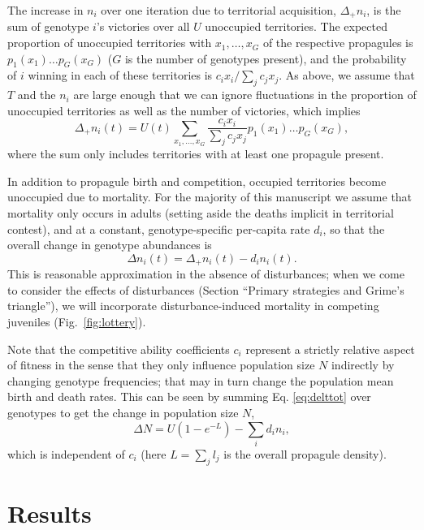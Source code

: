 \documentclass[11pt]{article}
\begin{document}
The increase in $n_i$ over one iteration due to territorial acquisition, $\Delta_+ n_i$, is the sum of genotype $i$'s victories over all $U$ unoccupied territories. The expected proportion of unoccupied territories with $x_1,\ldots,x_G$ of the respective propagules is $p_1(x_1)\ldots p_G(x_G)$ ($G$ is the number of genotypes present), and the probability of $i$ winning in each of these territories is $c_i x_i/\sum_j c_j x_j$. As above, we assume that $T$ and the $n_i$ are large enough that we can ignore fluctuations in the proportion of unoccupied territories as well as the number of victories, which implies
\begin{equation}
\Delta_+ n_i(t)=U(t)\sum_{x_1,\ldots,x_G} \frac{c_i x_i}{\sum_j c_j x_j} p_1(x_1)\ldots p_G(x_G), \label{eq:growthsumuncoupled}
\end{equation}
where the sum only includes territories with at least one propagule present. 

In addition to propagule birth and competition, occupied territories become unoccupied due to mortality. For the majority of this manuscript we assume that mortality only occurs in adults (setting aside the deaths implicit in territorial contest), and at a constant, genotype-specific per-capita rate $d_i$, so that the overall change in genotype abundances is
\begin{equation}
\Delta n_i(t)=\Delta_+ n_i(t)-d_i n_i(t). \label{eq:delttot}
\end{equation}
This is reasonable approximation in the absence of disturbances; when we come to consider the effects of disturbances (Section ``Primary strategies and Grime's triangle''), we will incorporate disturbance-induced mortality in competing juveniles (Fig.~\ref{fig:lottery}). 

Note that the competitive ability coefficients $c_i$ represent a strictly relative aspect of fitness in the sense that they only influence population size $N$ indirectly by changing genotype frequencies; that may in turn change the population mean birth and death rates. This can be seen by summing Eq. \eqref{eq:delttot} over genotypes to get the  change in population size $N$, 
\begin{equation}
\Delta N=U(1-e^{-L})-\sum_i d_i n_i,\label{eq:deltN}
\end{equation}
which is independent of $c_i$ (here $L=\sum_j l_j$ is the overall propagule density).

\section*{Results}
\end{document}
